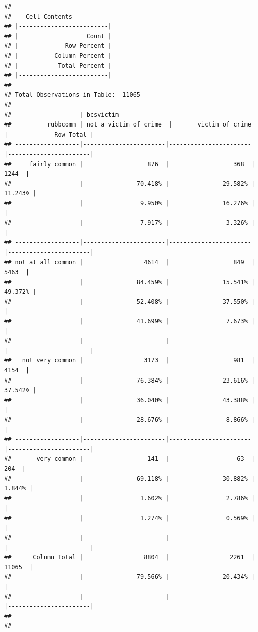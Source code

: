 \documentclass[]{book}
\theoremstyle{definition}
\theoremstyle{definition}
\theoremstyle{definition}
\theoremstyle{remark}
\begin{document}
\begin{verbatim}
## 
##    Cell Contents
## |-------------------------|
## |                   Count |
## |             Row Percent |
## |          Column Percent |
## |           Total Percent |
## |-------------------------|
## 
## Total Observations in Table:  11065 
## 
##                   | bcsvictim 
##          rubbcomm | not a victim of crime  |       victim of crime  |             Row Total | 
## ------------------|-----------------------|-----------------------|-----------------------|
##     fairly common |                  876  |                  368  |                 1244  | 
##                   |               70.418% |               29.582% |               11.243% | 
##                   |                9.950% |               16.276% |                       | 
##                   |                7.917% |                3.326% |                       | 
## ------------------|-----------------------|-----------------------|-----------------------|
## not at all common |                 4614  |                  849  |                 5463  | 
##                   |               84.459% |               15.541% |               49.372% | 
##                   |               52.408% |               37.550% |                       | 
##                   |               41.699% |                7.673% |                       | 
## ------------------|-----------------------|-----------------------|-----------------------|
##   not very common |                 3173  |                  981  |                 4154  | 
##                   |               76.384% |               23.616% |               37.542% | 
##                   |               36.040% |               43.388% |                       | 
##                   |               28.676% |                8.866% |                       | 
## ------------------|-----------------------|-----------------------|-----------------------|
##       very common |                  141  |                   63  |                  204  | 
##                   |               69.118% |               30.882% |                1.844% | 
##                   |                1.602% |                2.786% |                       | 
##                   |                1.274% |                0.569% |                       | 
## ------------------|-----------------------|-----------------------|-----------------------|
##      Column Total |                 8804  |                 2261  |                11065  | 
##                   |               79.566% |               20.434% |                       | 
## ------------------|-----------------------|-----------------------|-----------------------|
## 
## 
\end{verbatim}
\end{document}
